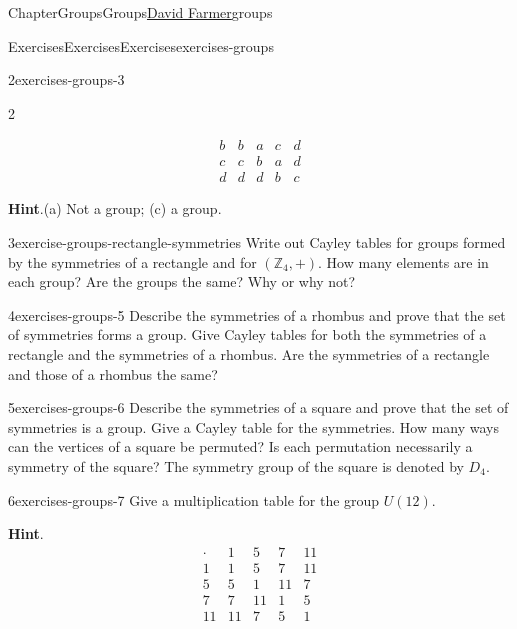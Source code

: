 \documentclass[oneside,10pt,]{book}
\newcommand{\blocktitlefont}{\relax}
\numberwithin{equation}{section}
\begin{document}
\begin{chapterptx}{Chapter}{Groups}{}{Groups}{\hyperlink{dfarmer}{David Farmer}}{}{groups}
\begin{exercises-section}{Exercises}{Exercises}{}{Exercises}{}{}{exercises-groups}
\begin{divisionexercise}{2}{}{}{exercises-groups-3}
\begin{multicols}{2}
\begin{enumerate}[label={(\alph*)}]
\begin{equation*}
\begin{array}{c|cccc}
b & b & a & c & d \\
c & c & b & a & d \\
d & d & d & b & c
\end{array}
\end{equation*}
%
\end{enumerate}
\end{multicols}
\par\smallskip%
\noindent\textbf{\blocktitlefont Hint}.\hypertarget{exercises-groups-3-2}{}\quad{}(a) Not a group; (c) a group.%
\end{divisionexercise}%
\begin{divisionexercise}{3}{}{}{exercise-groups-rectangle-symmetries}%
Write out Cayley tables for groups formed by the symmetries of a rectangle and for \(({\mathbb Z}_4, +)\). How many elements are in each group? Are the groups the same? Why or why not?%
\end{divisionexercise}%
\begin{divisionexercise}{4}{}{}{exercises-groups-5}%
Describe the symmetries of a rhombus and prove that the set of symmetries forms a group. Give Cayley tables for both the symmetries of a rectangle and the symmetries of a rhombus. Are the symmetries of a rectangle and those of a rhombus the same?%
\end{divisionexercise}%
\begin{divisionexercise}{5}{}{}{exercises-groups-6}%
Describe the symmetries of a square and prove that the set of symmetries is a group. Give a Cayley table for the symmetries. How many ways can the vertices of a square be permuted? Is each permutation necessarily a symmetry of the square?  The symmetry group of the square is denoted by \(D_4\).%
\end{divisionexercise}%
\begin{divisionexercise}{6}{}{}{exercises-groups-7}%
Give a multiplication table for the group \(U(12)\).%
\par\smallskip%
\noindent\textbf{\blocktitlefont Hint}.\hypertarget{exercises-groups-7-2}{}\quad{}%
\begin{equation*}
\begin{array}{c|cccc}
\cdot & 1  & 5  & 7  & 11 \\
\hline
1 & 1 & 5 & 7 & 11 \\ 5 & 5 & 1 & 11 & 7 \\
7 & 7 & 11 & 1 & 5 \\ 11 & 11 & 7 & 5 & 1
\end{array}
\end{equation*}

\end{divisionexercise}
\end{exercises-section}
\end{chapterptx}
\end{document}

